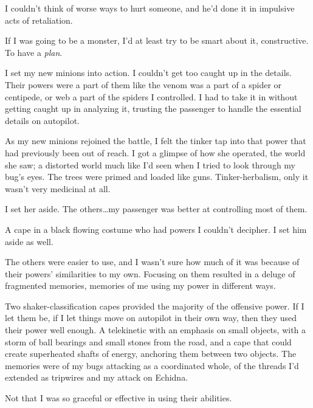 I couldn't think of worse ways to hurt someone, and he'd done it in impulsive acts of retaliation.



If I was going to be a monster, I'd at least try to be smart about it, constructive.  To have a \emph{plan}.



I set my new minions into action.  I couldn't get too caught up in the details.  Their powers were a part of them like the venom was a part of a spider or centipede, or web a part of the spiders I controlled.  I had to take it in without getting caught up in analyzing it, trusting the passenger to handle the essential details on autopilot.



As my new minions rejoined the battle, I felt the tinker tap into that power that had previously been out of reach.  I got a glimpse of how she operated, the world she saw; a distorted world much like I'd seen when I tried to look through my bug's eyes.  The trees were primed and loaded like guns.  Tinker-herbalism, only it wasn't very medicinal at all.



I set her aside.  The others\ldots my passenger was better at controlling most of them.



A cape in a black flowing costume who had powers I couldn't decipher.  I set him aside as well.



The others were easier to use, and I wasn't sure how much of it was because of their powers' similarities to my own.  Focusing on them resulted in a deluge of fragmented memories, memories of me using my power in different ways.



Two shaker-classification capes provided the majority of the offensive power.  If I let them be, if I let things move on autopilot in their own way, then they used their power well enough.  A telekinetic with an emphasis on small objects, with a storm of ball bearings and small stones from the road, and a cape that could create superheated shafts of energy, anchoring them between two objects.  The memories were of my bugs attacking as a coordinated whole, of the threads I'd extended as tripwires and my attack on Echidna.



Not that I was so graceful or effective in using their abilities.



